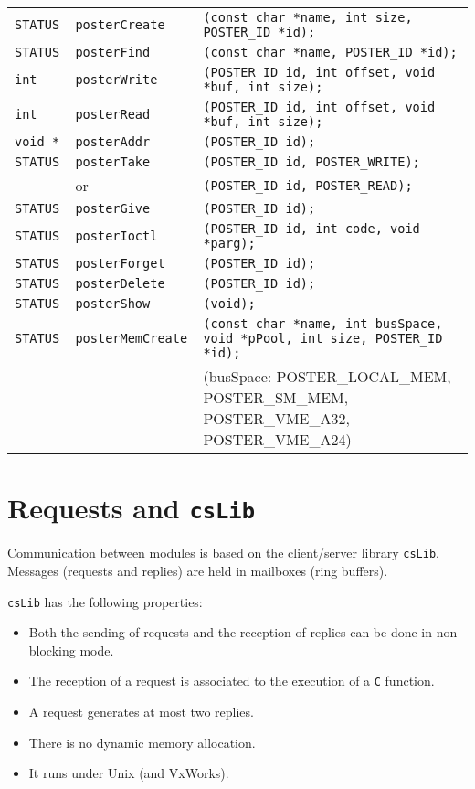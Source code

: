 \begin{center}\small\begin{tabularx}{\linewidth}{|llX|}
\hline
\tt STATUS  & \tt posterCreate & \tt (const char *name,      int size,
	                        POSTER\_ID *id); \\
\tt STATUS  & \tt posterFind   & \tt (const char *name,      POSTER\_ID *id); \\
\tt int     & \tt posterWrite  & \tt (POSTER\_ID id,   int offset,
	    		        void *buf,         int size); \\
\tt int     & \tt posterRead   & \tt (POSTER\_ID id,   int offset, 
	                        void *buf,     int size); \\
\tt void *  & \tt posterAddr   & \tt (POSTER\_ID id);  \\
\tt STATUS  & \tt posterTake   & \tt (POSTER\_ID id,   POSTER\_WRITE); \\
	    & 	or    	       & \tt (POSTER\_ID id,   POSTER\_READ); \\
\tt STATUS  & \tt posterGive   & \tt (POSTER\_ID id);   \\
\tt STATUS  & \tt posterIoctl  & \tt (POSTER\_ID id, int code, void *parg); \\
\tt STATUS  & \tt posterForget & \tt (POSTER\_ID id);  \\
\tt STATUS  & \tt posterDelete & \tt (POSTER\_ID id);  \\
\tt STATUS  & \tt posterShow   & \tt (void);  \\
\tt STATUS  & \tt posterMemCreate & \tt (const char *name,  int busSpace,
				void *pPool, int size, POSTER\_ID *id); \\
& & {\footnotesize (busSpace: POSTER\_LOCAL\_MEM,
	    POSTER\_SM\_MEM, POSTER\_VME\_A32, POSTER\_VME\_A24)} \\
\hline
\end{tabularx}\end{center}


\section{Requests and \texttt{csLib}}

Communication between modules is based  on the client/server library 
\texttt{csLib}. Messages   (requests and replies)  are   held in mailboxes  (ring
buffers).

\texttt{csLib} has the following properties:
\begin{itemize}
\item Both the sending of requests and the reception of replies can be
done in non-blocking mode.
\item The reception of a request is associated to the execution of a 
\texttt{C} function.
\item A request generates at most two replies.
\item There is no dynamic memory allocation.
\item It runs under Unix (and VxWorks).
\end{itemize}

